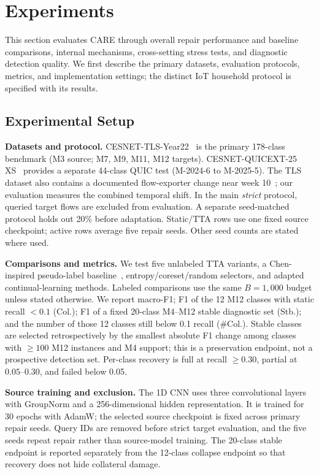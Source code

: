 \documentclass[journal]{IEEEtran}
\newcommand{\ours}{CARE}  %
\begin{document}
\section{Experiments}
\label{sec:experiments}

This section evaluates \ours{} through overall repair performance and baseline comparisons, internal mechanisms, cross-setting stress tests, and diagnostic detection quality. We first describe the primary datasets, evaluation protocols, metrics, and implementation settings; the distinct IoT household protocol is specified with its results.

\subsection{Experimental Setup}
\label{sec:exp_setup}


\textbf{Datasets and protocol.} CESNET-TLS-Year22~\cite{hynek2024cesnet} is the primary 178-class benchmark (M3 source; M7, M9, M11, M12 targets). CESNET-QUICEXT-25 XS~\cite{cesnetquicext25,mucke2025waiting} provides a separate 44-class QUIC test (M-2024-6 to M-2025-5). The TLS dataset also contains a documented flow-exporter change near week 10~\cite{hynek2024cesnet}; our evaluation measures the combined temporal shift. In the main \textit{strict} protocol, queried target flows are excluded from evaluation. A separate seed-matched protocol holds out 20\% before adaptation. Static/TTA rows use one fixed source checkpoint; active rows average five repair seeds. Other seed counts are stated where used.

\textbf{Comparisons and metrics.} We test five unlabeled TTA variants, a Chen-inspired pseudo-label baseline~\cite{chen2025selfevolving}, entropy/coreset/random selectors, and adapted continual-learning methods. Labeled comparisons use the same $B=1{,}000$ budget unless stated otherwise. We report macro-F1; F1 of the 12 M12 classes with static recall $<0.1$ (Col.); F1 of a fixed 20-class M4--M12 stable diagnostic set (Stb.); and the number of those 12 classes still below 0.1 recall (\#Col.). Stable classes are selected retrospectively by the smallest absolute F1 change among classes with $\geq100$ M12 instances and M4 support; this is a preservation endpoint, not a prospective detection set. Per-class recovery is full at recall $\geq0.30$, partial at $0.05$--$0.30$, and failed below 0.05.

\textbf{Source training and exclusion.} The 1D CNN uses three convolutional layers with GroupNorm and a 256-dimensional hidden representation. It is trained for 30 epochs with AdamW; the selected source checkpoint is fixed across primary repair seeds. Query IDs are removed before strict target evaluation, and the five seeds repeat repair rather than source-model training. The 20-class stable endpoint is reported separately from the 12-class collapse endpoint so that recovery does not hide collateral damage.
\end{document}
